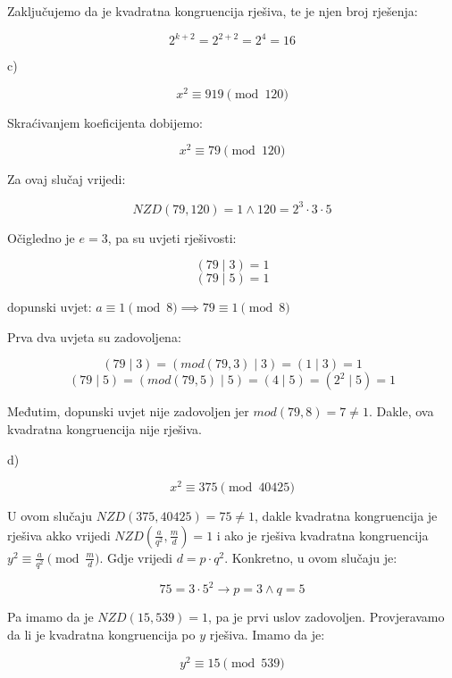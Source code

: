 \documentclass[12pt]{article}
\begin{document}
Zaključujemo da je kvadratna kongruencija rješiva, te je njen broj rješenja:

$$2^{k + 2} = 2^{2 + 2} = 2^4 = 16$$\vspace{1mm}

\newpage

c)

$$x^2 \equiv 919 \pmod{120}$$\vspace{1mm}

Skraćivanjem koeficijenta dobijemo:

$$x^2 \equiv 79 \pmod{120}$$\vspace{1mm}

Za ovaj slučaj vrijedi:

$$NZD(79, 120) = 1 \land 120 = 2^3 \cdot 3 \cdot 5$$\vspace{1mm}

Očigledno je $e = 3$, pa su uvjeti rješivosti:

$$(79 \mid 3) = 1$$
$$(79 \mid 5) = 1$$
\begin{center}
dopunski uvjet: $a \equiv 1 \pmod{8} \implies 79 \equiv 1\pmod{8}$
\end{center}

Prva dva uvjeta su zadovoljena:

$$(79 \mid 3) = (mod(79, 3) \mid 3) = (1 \mid 3) = 1$$
$$(79 \mid 5) = (mod(79, 5) \mid 5) = (4 \mid 5) = (2^2 \mid 5) = 1$$\vspace{1mm}

Međutim, dopunski uvjet nije zadovoljen jer $mod(79, 8) = 7 \neq 1$. Dakle, ova kvadratna kongruencija nije rješiva.

\newpage

d)

$$x^2 \equiv 375 \pmod{40425}$$\vspace{1mm}

U ovom slučaju $NZD(375, 40425) = 75 \neq 1$, dakle kvadratna kongruencija je rješiva akko vrijedi $NZD(\frac{a}{q^2}, \frac{m}{d}) = 1$ i ako je rješiva kvadratna kongruencija
$y^2 \equiv \frac{a}{q^2} \pmod{\frac{m}{d}}$. Gdje vrijedi $d = p \cdot q^2$. Konkretno, u ovom slučaju je:

$$75 = 3 \cdot 5^2 \to p = 3 \land q = 5$$\vspace{1mm}

Pa imamo da je $NZD(15, 539) = 1$, pa je prvi uslov zadovoljen. Provjeravamo da li je kvadratna kongruencija po $y$ rješiva. Imamo da je:

$$y^2 \equiv 15 \pmod{539}$$\vspace{1mm}
\end{document}
